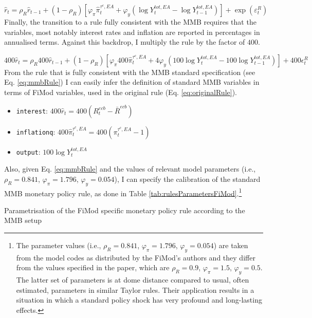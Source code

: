 \documentclass{article}
\begin{document}
\[
\hat{r}_{t}=\rho_{R}\hat{r}_{t-1}+\left(1-\rho_{R}\right)\left[\varphi_{\pi}\hat{\pi}_{t}^{\tau^{c},EA}+\varphi_{y}\left(\log Y_{t}^{tot,EA}-\log Y_{t-1}^{tot,EA}\right)\right]+\exp\left(\varepsilon_{t}^{R}\right)
\]
Finally, the transition to a rule fully consistent with the MMB requires
that the variables, most notably interest rates and inflation are
reported in percentages in annualised terms. Against this backdrop,
I multiply the rule by the factor of $400$.

\begin{equation}
400\hat{r}_{t}=\rho_{R}400\hat{r}_{t-1}+\left(1-\rho_{R}\right)\left[\varphi_{\pi}400\hat{\pi}_{t}^{\tau^{c},EA}+4\varphi_{y}\left(100\log Y_{t}^{tot,EA}-100\log Y_{t-1}^{tot,EA}\right)\right]+400\epsilon_{t}^{R}\label{eq:mmbRule}
\end{equation}
From the rule that is fully consistent with the MMB standard specification
(see Eq. \ref{eq:mmbRule}) I can easily infer the definition of standard
MMB variables in terms of FiMod variables, used in the original rule
(Eq. \ref{eq:originalRule}).
\begin{itemize}
\item \texttt{interest}: $400\hat{r}_{t}=400\left(R_{t}^{ecb}-\bar{R}^{ecb}\right)$
\item \texttt{inflationq}: $400\hat{\pi}_{t}^{\tau^{c},EA}=400\left(\pi_{t}^{\tau^{c},EA}-1\right)$
\item \texttt{output}: $100\log Y_{t}^{tot,EA}$
\end{itemize}
Also, given Eq. \ref{eq:mmbRule} and the values of relevant model
parameters (i.e., $\rho_{R}=0.841$, $\varphi_{\pi}=1.796$, $\varphi_{y}=0.054$),
I can specify the calibration of the standard MMB monetary policy
rule, as done in Table \ref{tab:rulesParametersFiMod}.\footnote{The parameter values (i.e., $\rho_{R}=0.841$, $\varphi_{\pi}=1.796$,
$\varphi_{y}=0.054$) are taken from the model codes as distributed
by the FiMod's authors and they differ from the values specified in
the paper, which are $\rho_{R}=0.9$, $\varphi_{\pi}=1.5$, $\varphi_{y}=0.5$.
The latter set of parameters is at dome distance compared to usual,
often estimated, parameters in similar Taylor rules. Their application
results in a situation in which a standard policy shock has very profound
and long-lasting effects.}

\begin{table}[H]
\caption{Parametrisation of the FiMod specific monetary policy rule according
to the MMB setup \label{tab:rulesParametersFiMod}}

\begin{small}
\begin{center}



\end{center}
\end{small}

\bigskip{}

\end{table}
\end{document}
